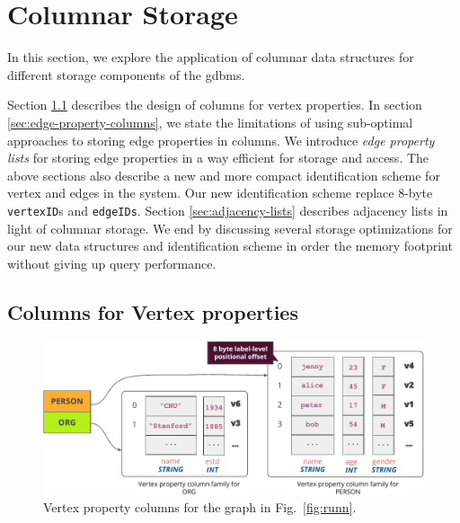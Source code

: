 \chapter{Columnar Storage}
\label{c:columnar-storage}

In this section, we explore the application of columnar data structures for different storage components of the \gls{gdbms}. 

Section \ref{sec:vertex-property-columns} describes the design of columns for vertex properties. In section \ref{sec:edge-property-columns}, we state the limitations of using sub-optimal approaches to storing edge properties in columns. We introduce \emph{edge property lists} for storing edge properties in a way efficient for storage and access. The above sections also describe a new and more compact identification scheme for vertex and edges in the system. Our new identification scheme replace 8-byte \texttt{vertexID}s and \texttt{edgeIDs}. Section \ref{sec:adjacency-lists} describes adjacency lists in light of columnar storage. We end by discussing several storage optimizations for our new data structures and identification scheme in order the memory footprint without giving up query performance.

\section{Columns for Vertex properties}
\label{sec:vertex-property-columns}

\begin{figure}
	\vspace{-15pt}
	\hfill\includegraphics[scale=0.85]{img/vpcols}\hspace*{\fill}
	\caption{Vertex property columns for the graph in Fig.~\ref{fig:runn}.}
	\label{fig:vpcols}
	\vspace{-8pt}
\end{figure}

